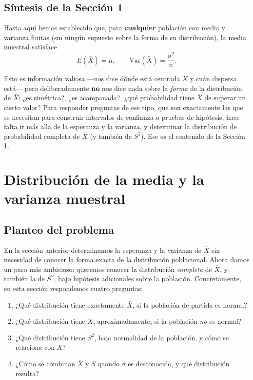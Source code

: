 \documentclass[11pt,a4paper]{article}
\theoremstyle{plain}
\theoremstyle{definition}
\theoremstyle{remark}
\begin{document}
\subsection{Síntesis de la Sección 1}

Hasta aquí hemos establecido que, para \textbf{cualquier} población con media y varianza finitas (sin ningún supuesto sobre la forma de su distribución), la media muestral satisface
$$E(\bar X) = \mu, \qquad \mathrm{Var}(\bar X) = \frac{\sigma^2}{n}.$$

Esto es información valiosa —nos dice dónde está centrada $\bar X$ y cuán dispersa está— pero deliberadamente \textbf{no} nos dice nada sobre la \emph{forma} de la distribución de $\bar X$: ¿es simétrica?, ¿es acampanada?, ¿qué probabilidad tiene $\bar X$ de superar un cierto valor? Para responder preguntas de ese tipo, que son exactamente las que se necesitan para construir intervalos de confianza o pruebas de hipótesis, hace falta ir más allá de la esperanza y la varianza, y determinar la distribución de probabilidad completa de $\bar X$ (y también de $S^2$). Ese es el contenido de la Sección \ref{sec:distribucion-exacta}.

\newpage
\section{Distribución de la media y la varianza muestral}
\label{sec:distribucion-exacta}

\subsection{Planteo del problema}

En la sección anterior determinamos la esperanza y la varianza de $\bar X$ sin necesidad de conocer la forma exacta de la distribución poblacional. Ahora damos un paso más ambicioso: queremos conocer la distribución \emph{completa} de $\bar X$, y también la de $S^2$, bajo hipótesis adicionales sobre la población. Concretamente, en esta sección respondemos cuatro preguntas:

\begin{enumerate}
\item ¿Qué distribución tiene exactamente $\bar X$, si la población de partida es normal?
\item ¿Qué distribución tiene $\bar X$, aproximadamente, si la población \emph{no} es normal?
\item ¿Qué distribución tiene $S^2$, bajo normalidad de la población, y cómo se relaciona con $\bar X$?
\item ¿Cómo se combinan $\bar X$ y $S$ quando $\sigma$ es desconocido, y qué distribución resulta?
\end{enumerate}
\end{document}
